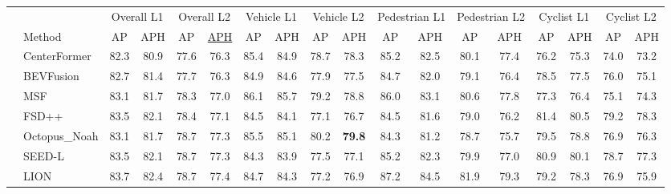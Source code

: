 \begin{table}[]
    \centering
    \footnotesize
    \setlength{\tabcolsep}{4pt}
    \begin{tabular}{@{}llcccccccccccccccc@{}}
    \toprule
    &               & \multicolumn{2}{c}{Overall L1} & \multicolumn{2}{c}{Overall L2} & \multicolumn{2}{c}{Vehicle L1} & \multicolumn{2}{c}{Vehicle L2} & \multicolumn{2}{c}{Pedestrian L1} & \multicolumn{2}{c}{Pedestrian L2} & \multicolumn{2}{c}{Cyclist L1} & \multicolumn{2}{c}{Cyclist L2} \\ 
    \cmidrule(lr){3-4} \cmidrule(lr){5-6} \cmidrule(lr){7-8} \cmidrule(lr){9-10} \cmidrule(lr){11-12} \cmidrule(lr){13-14} \cmidrule(lr){15-16} \cmidrule(lr){17-18}
    & Method                                         & AP   & APH  & AP   & \underline{APH}  & AP   & APH  & AP   & APH  & AP   & APH  & AP   & APH  & AP   & APH  & AP   & APH  \\ \midrule
    & CenterFormer~\cite{zhou2022centerformer}       & 82.3 & 80.9 & 77.6 & 76.3 & 85.4 & 84.9 & 78.7 & 78.3 & 85.2 & 82.5 & 80.1 & 77.4 & 76.2 & 75.3 & 74.0 & 73.2 \\
    & BEVFusion~\cite{liu2023bevfusion}              & 82.7 & 81.4 & 77.7 & 76.3 & 84.9 & 84.6 & 77.9 & 77.5 & 84.7 & 82.0 & 79.1 & 76.4 & 78.5 & 77.5 & 76.0 & 75.1 \\
    & MSF~\cite{he2023msf}                           & 83.1 & 81.7 & 78.3 & 77.0 & 86.1 & 85.7 & 79.2 & 78.8 & 86.0 & 83.1 & 80.6 & 77.8 & 77.3 & 76.4 & 75.1 & 74.3 \\
    & FSD++~\cite{fan2023super}                      & 83.5 & 82.1 & 78.4 & 77.1 & 84.5 & 84.1 & 77.1 & 76.7 & 84.5 & 81.6 & 79.0 & 76.2 & 81.4 & 80.5 & 79.2 & 78.3 \\
    & Octopus\_Noah                                  & 83.1 & 81.7 & 78.7 & 77.3 & 85.5 & 85.1 & 80.2 & \textbf{79.8} & 84.3 & 81.2 & 78.7 & 75.7 & 79.5 & 78.8 & 76.9 & 76.3 \\
    & SEED-L~\cite{liu2024seed}                      & 83.5 & 82.1 & 78.7 & 77.3 & 84.3 & 83.9 & 77.5 & 77.1 & 85.2 & 82.3 & 79.9 & 77.0 & 80.9 & 80.1 & 78.7 & 77.3 \\
    & LION~\cite{liu2024lion}                        & 83.7 & 82.4 & 78.7 & 77.4 & 84.7 & 84.3 & 77.2 & 76.9 & 87.2 & 84.5 & 81.9 & 79.3 & 79.2 & 78.3 & 76.9 & 75.9 \\

\end{tabular}
\end{table}
